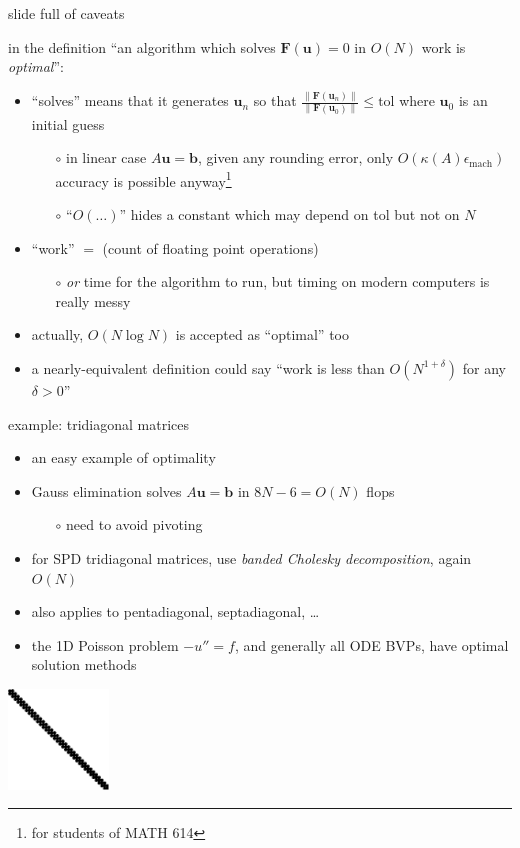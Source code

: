 \documentclass[hide notes,intlimits,usenames,dvipsnames]{beamer}
\newcommand{\bb}{\mathbf{b}}
\newcommand{\bu}{\mathbf{u}}
\newcommand{\eps}{\epsilon}
\begin{document}
\begin{frame}{slide full of caveats}

in the definition ``an algorithm which solves $\mathbf{F}(\mathbf{u}) = 0$ in $O(N)$ work is \emph{optimal}'':
\begin{itemize}
\item  ``solves'' means that it generates $\mathbf{u}_n$ so that $\frac{\|\mathbf{F}(\mathbf{u}_n)\|}{\|\mathbf{F}(\mathbf{u}_0)\|} \le \text{tol}$ where $\mathbf{u}_0$ is an initial guess
	\begin{itemize}
	\item[$\circ$] in linear case $A\bu=\bb$, given any rounding error, only $O(\kappa(A)\eps_{\text{mach}})$ accuracy is possible anyway\footnote{for students of MATH 614}
    \item[$\circ$] ``$O(\dots)$'' hides a constant which may depend on tol but not on $N$
	\end{itemize}
\item ``work'' $=$ (count of floating point operations)
	\begin{itemize}
	\item[$\circ$] \emph{or} time for the algorithm to run, but timing on modern computers is really messy
	\end{itemize}
\item actually, $O(N\log N)$ is accepted as ``optimal'' too
\item a nearly-equivalent definition could say ``work is less than $O(N^{1+\delta})$ for any $\delta>0$''
\end{itemize}
\end{frame}


\begin{frame}{example: tridiagonal matrices}
\begin{itemize}
\item an easy example of optimality
\item Gauss elimination solves $A \bu = \bb$ in $8N-6=O(N)$ flops
	\begin{itemize}
	\item[$\circ$] need to avoid pivoting
	\end{itemize}
\item for SPD tridiagonal matrices, use \emph{banded Cholesky decomposition}, again $O(N)$
\item also applies to pentadiagonal, septadiagonal, \dots
\item the 1D Poisson problem $-u''=f$, and generally all ODE BVPs, have optimal solution methods
\end{itemize}

\bigskip
\begin{center}
\includegraphics[width=0.2\textwidth]{figs/spytri}
\end{center}
\end{frame}
\end{document}
